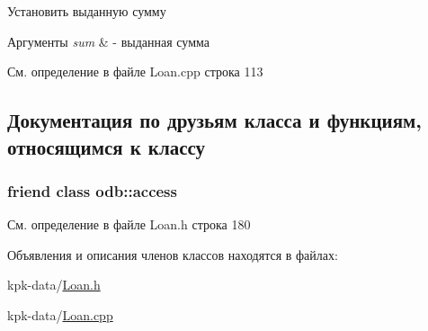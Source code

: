 Установить выданную сумму 


\begin{DoxyParams}{Аргументы}
{\em sum} & -\/ выданная сумма \\
\hline
\end{DoxyParams}


См. определение в файле Loan.\+cpp строка 113



\subsection{Документация по друзьям класса и функциям, относящимся к классу}
\subsubsection[{\texorpdfstring{odb\+::access}{odb::access}}]{\setlength{\rightskip}{0pt plus 5cm}friend class odb\+::access\hspace{0.3cm}{\ttfamily [friend]}}\hypertarget{classkpk_1_1data_1_1_loan_acb4d953abf85ae525f1d06a0c3a86a55}{}\label{classkpk_1_1data_1_1_loan_acb4d953abf85ae525f1d06a0c3a86a55}


См. определение в файле Loan.\+h строка 180



Объявления и описания членов классов находятся в файлах\+:\begin{DoxyCompactItemize}
\item 
kpk-\/data/\hyperlink{_loan_8h}{Loan.\+h}\item 
kpk-\/data/\hyperlink{_loan_8cpp}{Loan.\+cpp}\end{DoxyCompactItemize}

